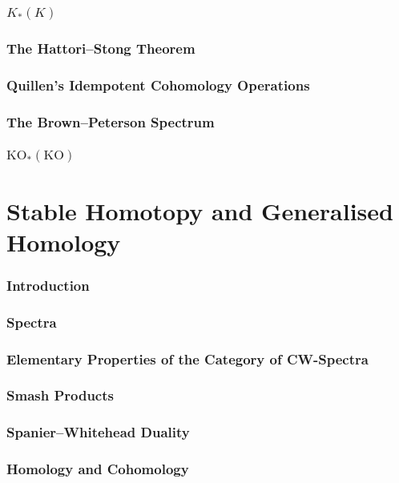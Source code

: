 \documentclass[english, oneside, letterpaper]{book}
\newcommand{\KO}{\mathrm{KO}}
\begin{document}
\section{\texorpdfstring{$K_*(K)$}{K_*(K)}}\label{sec:part-2-sec-13}
\section{The Hattori--Stong Theorem}\label{sec:part-2-sec-14}
\section{Quillen's Idempotent Cohomology Operations}\label{sec:part-2-sec-15}
\section{The Brown--Peterson Spectrum}\label{sec:part-2-sec-16}
\section{\texorpdfstring{$\KO_*(\KO)$}{KO_*(KO)}}\label{sec:part-2-sec-17}
\part{Stable Homotopy and Generalised Homology}\label{part:3}
\setcounter{section}{0}
\section{Introduction}\label{sec:part-3-sec-1}
\section{Spectra}\label{sec:part-3-sec-2}
\section{Elementary Properties of the Category of CW-Spectra}\label{sec:part-3-sec-3}
\section{Smash Products}\label{sec:part-3-sec-3}
\section{Spanier--Whitehead Duality}\label{sec:part-3-sec-5}
\section{Homology and Cohomology}\label{sec:part-3-sec-6}
\end{document}
